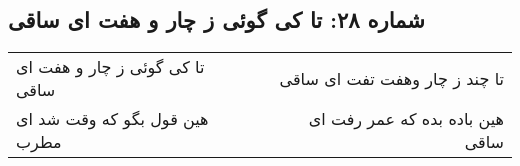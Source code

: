 \begin{center}
\section*{شماره ۲۸: تا کی گوئی ز چار و هفت ای ساقی}
\label{sec:028}
\begin{longtable}{l p{0.5cm} r}
تا کی گوئی ز چار و هفت ای ساقی
&&
تا چند ز چار وهفت تفت ای ساقی
\\
هین قول بگو که وقت شد ای مطرب
&&
هین باده بده که عمر رفت ای ساقی
\\
\end{longtable}
\end{center}
